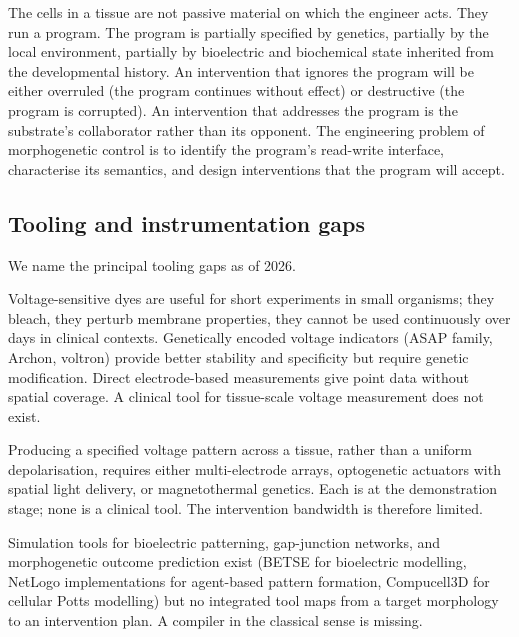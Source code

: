 \begin{principle}
The cells in a tissue are not passive material on which the engineer
acts. They run a program. The program is partially specified by
genetics, partially by the local environment, partially by bioelectric
and biochemical state inherited from the developmental history. An
intervention that ignores the program will be either overruled (the
program continues without effect) or destructive (the program is
corrupted). An intervention that addresses the program is the
substrate's collaborator rather than its opponent. The engineering
problem of morphogenetic control is to identify the program's
read-write interface, characterise its semantics, and design
interventions that the program will accept.
\end{principle}

\subsection{Tooling and instrumentation gaps}

We name the principal tooling gaps as of 2026.

 Voltage-sensitive dyes are
useful for short experiments in small organisms; they bleach, they
perturb membrane properties, they cannot be used continuously over days
in clinical contexts. Genetically encoded voltage indicators (ASAP
family, Archon, voltron) provide better stability and specificity but
require genetic modification. Direct electrode-based measurements give
point data without spatial coverage. A clinical tool for tissue-scale
voltage measurement does not exist.

 Producing a specified
voltage pattern across a tissue, rather than a uniform depolarisation,
requires either multi-electrode arrays, optogenetic actuators with
spatial light delivery, or magnetothermal genetics. Each is at the
demonstration stage; none is a clinical tool. The intervention
bandwidth is therefore limited.

 Simulation tools for bioelectric
patterning, gap-junction networks, and morphogenetic outcome prediction
exist (BETSE for bioelectric modelling, NetLogo implementations for
agent-based pattern formation, Compucell3D for cellular Potts
modelling) but no integrated tool maps from a target morphology to an
intervention plan. A compiler in the classical sense is missing.

